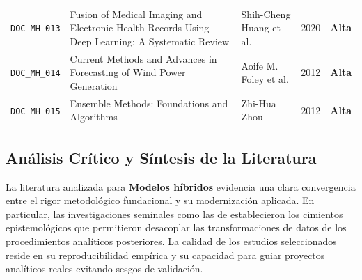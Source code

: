 \begin{table}[H]
\begin{tabular}{p{1.8cm}p{4.5cm}p{3.2cm}cc}
\texttt{DOC_MH_013} & Fusion of Medical Imaging and Electronic Health Records Using Deep Learning: A Systematic Review & Shih-Cheng Huang et al. & 2020 & \textbf{Alta} \\
\texttt{DOC_MH_014} & Current Methods and Advances in Forecasting of Wind Power Generation & Aoife M. Foley et al. & 2012 & \textbf{Alta} \\
\texttt{DOC_MH_015} & Ensemble Methods: Foundations and Algorithms & Zhi-Hua Zhou & 2012 & \textbf{Alta} \\
\bottomrule
\end{tabular}
\end{table}


\subsection{Análisis Crítico y Síntesis de la Literatura}
La literatura analizada para \textbf{Modelos híbridos} evidencia una clara convergencia entre el rigor metodológico fundacional y su modernización aplicada. 
En particular, las investigaciones seminales como las de \citeauthor{witold} establecieron los cimientos epistemológicos que permitieron desacoplar las transformaciones de datos de los procedimientos analíticos posteriores. 
La calidad de los estudios seleccionados reside en su reproducibilidad empírica y su capacidad para guiar proyectos analíticos reales evitando sesgos de validación.


